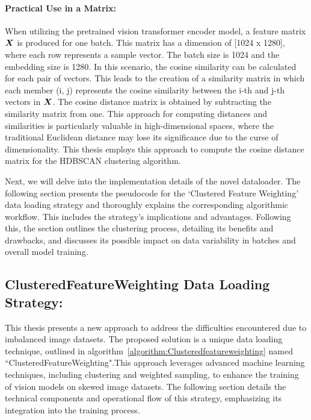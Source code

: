 \paragraph{Practical Use in a Matrix:}
When utilizing the pretrained vision transformer encoder model, a feature matrix \( \displaystyle {\bm{X}} \) is produced for one batch. This matrix has a dimension of [1024 x 1280], where each row represents a sample vector. The batch size is 1024 and the embedding size is 1280. In this scenario, the cosine similarity can be calculated for each pair of vectors. This leads to the creation of a similarity matrix in which each member (i, j) represents the cosine similarity between the i-th and j-th vectors in \(\displaystyle {\bm{X}} \). The cosine distance matrix is obtained by subtracting the similarity matrix from one. This approach for computing distances and similarities is particularly valuable in high-dimensional spaces, where the traditional Euclidean distance may lose its significance due to the curse of dimensionality. This thesis employs this approach to compute the cosine distance matrix for the HDBSCAN clustering algorithm.

Next, we will delve into the implementation details of the novel dataloader. The following section presents the pseudocode for the `Clustered Feature Weighting' data loading strategy and thoroughly explains the corresponding algorithmic workflow. This includes the strategy's implications and advantages. Following this, the section outlines the clustering process, detailing its benefits and drawbacks, and discusses its possible impact on data variability in batches and overall model training.

\subsection{ClusteredFeatureWeighting Data Loading Strategy:}
\label{section:ClusteredFeatureWeighting Data Loading Strategy}
This thesis presents a new approach to address the difficulties encountered due to imbalanced image datasets. The proposed solution is a unique data loading technique, outlined in algorithm~\ref{algorithm:Clusteredfeatureweighting} named ``ClusteredFeatureWeighting".This approach leverages advanced machine learning techniques, including clustering and weighted sampling, to enhance the training of vision models on skewed image datasets. The following section details the technical components and operational flow of this strategy, emphasizing its integration into the training process.


